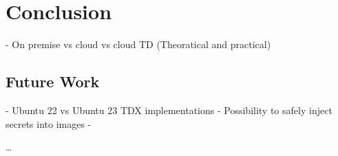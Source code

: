 
\chapter{Conclusion}
\label{ch:Conclusion}

- On premise vs cloud vs cloud TD (Theoratical and practical) 

\section{Future Work}
- Ubuntu 22 vs Ubuntu 23 TDX implementations
- Possibility to safely inject secrets into images
- 

\dots